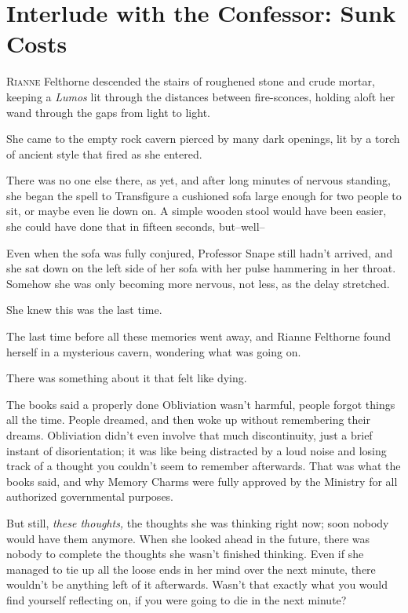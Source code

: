 \chapter{Interlude with the Confessor: Sunk Costs}

\lettrine{R}{ianne} Felthorne descended the stairs of roughened stone and crude mortar, keeping a \emph{Lumos} lit through the distances between fire-sconces, holding aloft her wand through the gaps from light to light.

She came to the empty rock cavern pierced by many dark openings, lit by a torch of ancient style that fired as she entered.

There was no one else there, as yet, and after long minutes of nervous standing, she began the spell to Transfigure a cushioned sofa large enough for two people to sit, or maybe even lie down on. A simple wooden stool would have been easier, she could have done that in fifteen seconds, but\---well\---

Even when the sofa was fully conjured, Professor Snape still hadn't arrived, and she sat down on the left side of her sofa with her pulse hammering in her throat. Somehow she was only becoming more nervous, not less, as the delay stretched.

She knew this was the last time.

The last time before all these memories went away, and Rianne Felthorne found herself in a mysterious cavern, wondering what was going on.

There was something about it that felt like dying.

The books said a properly done Obliviation wasn't harmful, people forgot things all the time. People dreamed, and then woke up without remembering their dreams. Obliviation didn't even involve that much discontinuity, just a brief instant of disorientation; it was like being distracted by a loud noise and losing track of a thought you couldn't seem to remember afterwards. That was what the books said, and why Memory Charms were fully approved by the Ministry for all authorized governmental purposes.

But still, \emph{these thoughts,} the thoughts she was thinking right now; soon nobody would have them anymore. When she looked ahead in the future, there was nobody to complete the thoughts she wasn't finished thinking. Even if she managed to tie up all the loose ends in her mind over the next minute, there wouldn't be anything left of it afterwards. Wasn't that exactly what you would find yourself reflecting on, if you were going to die in the next minute?

